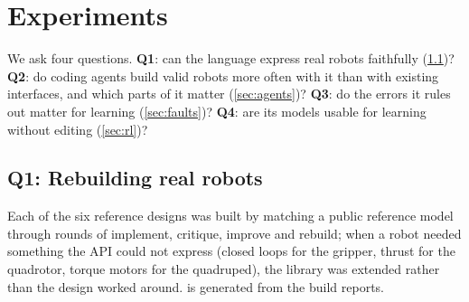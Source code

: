 \section{Experiments}
\label{sec:experiments}

We ask four questions. \textbf{Q1}: can the language express real robots faithfully
(\cref{sec:fidelity})? \textbf{Q2}: do coding agents build valid robots more often with it than
with existing interfaces, and which parts of it matter (\cref{sec:agents})? \textbf{Q3}: do the
errors it rules out matter for learning (\cref{sec:faults})? \textbf{Q4}: are its models usable for
learning without editing (\cref{sec:rl})?

\subsection{Q1: Rebuilding real robots}
\label{sec:fidelity}
Each of the six reference designs was built by matching a public reference model through rounds of
implement, critique, improve and rebuild; when a robot needed something the API could not express
(closed loops for the gripper, thrust for the quadrotor, torque motors for the quadruped), the
library was extended rather than the design worked around.  is generated from
the build reports.

\begin{table}[t]
  \centering
  \caption{The bundled designs, from their build reports. LoC: non-blank, non-comment lines of the
  design file. $\Delta m$: total mass against the reference model (omitted where there is no
  independent reference; the G1's link masses are taken from its reference as budgets). Coll.:
  overlapping part pairs at home. Full range: joints whose sweep reaches both declared limits;
  the limits found are physical self-contacts (gripper pads meeting at closure, left and right
  feet meeting at full abduction, the SO-101 elbow stopping at 2.36\,rad as the reference's
  does). Test: the class test of \cref{sec:report}; Microduck's reference model also fails the
  actuator-only stand test at its real mass.}
  \label{tab:designs}
  
\end{table}


